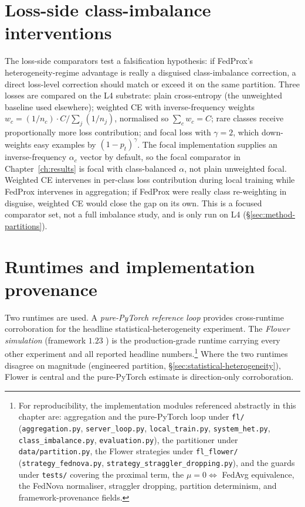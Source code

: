 \documentclass[11pt,a4paper]{report}
\begin{document}
\section{Loss-side class-imbalance interventions}
\label{sec:method-losses}

The loss-side comparators test a falsification hypothesis: if FedProx's
heterogeneity-regime advantage is really a disguised class-imbalance
correction, a direct loss-level correction should match or exceed it on
the same partition. Three losses are compared on the L4 substrate:
plain cross-entropy
(the unweighted baseline used elsewhere); weighted CE with
inverse-frequency weights $w_c = (1/n_c) \cdot C / \sum_j (1/n_j)$,
normalised so $\sum_c w_c = C$; rare classes receive proportionally
more loss contribution; and focal loss \citep{lin2017focal} with
$\gamma = 2$,
which down-weights easy examples by $(1 - p_t)^{\gamma}$. The focal
implementation supplies an inverse-frequency $\alpha_c$ vector by
default, so the focal comparator in Chapter~\ref{ch:results} is focal
with class-balanced $\alpha$, not plain unweighted focal. Weighted CE
intervenes in per-class loss contribution during local training while
FedProx intervenes in aggregation; if FedProx were really class
re-weighting in disguise, weighted CE would close the gap on its own.
This is a focused comparator set, not a full imbalance study, and is
only run on L4 (§\ref{sec:method-partitions}).

\section{Runtimes and implementation provenance}
\label{sec:method-runtimes}

Two runtimes are used. A \emph{pure-PyTorch reference loop} provides
cross-runtime corroboration for the headline statistical-heterogeneity
experiment. The \emph{Flower simulation} (framework $1.23$
\citep{beutel2020flower}) is the production-grade runtime carrying
every other experiment and all reported headline numbers.\footnote{For
reproducibility, the implementation modules referenced abstractly in
this chapter are: aggregation and the pure-PyTorch loop under
\texttt{fl/} (\texttt{aggregation.py}, \texttt{server\_loop.py},
\texttt{local\_train.py}, \texttt{system\_het.py},
\texttt{class\_imbalance.py}, \texttt{evaluation.py}), the partitioner
under \texttt{data/partition.py}, the Flower strategies under
\texttt{fl\_flower/} (\texttt{strategy\_fednova.py},
\texttt{strategy\_straggler\_dropping.py}), and the guards under
\texttt{tests/} covering the proximal term, the
$\mu = 0 \Leftrightarrow$ FedAvg equivalence, the FedNova normaliser,
straggler dropping, partition determinism, and framework-provenance
fields.} Where the two runtimes disagree on magnitude (engineered
partition, §\ref{sec:statistical-heterogeneity}), Flower is central and
the pure-PyTorch estimate is direction-only corroboration.
\end{document}
